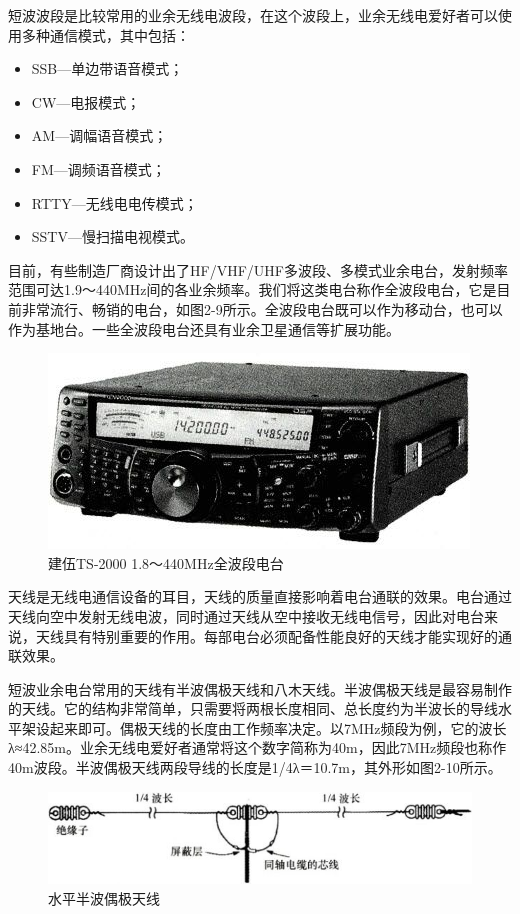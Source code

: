 \documentclass[12pt,UTF8]{ctexbook}
\begin{document}
短波波段是比较常用的业余无线电波段，在这个波段上，业余无线电爱好者可以使用多种通信模式，其中包括：

\begin{itemize}
	\item SSB—单边带语音模式；
	\item CW—电报模式；
	\item AM—调幅语音模式；
	\item FM—调频语音模式；
	\item RTTY—无线电电传模式；
	\item SSTV—慢扫描电视模式。
\end{itemize}

目前，有些制造厂商设计出了HF/VHF/UHF多波段、多模式业余电台，发射频率范围可达1.9～440MHz间的各业余频率。我们将这类电台称作全波段电台，它是目前非常流行、畅销的电台，如图2-9所示。全波段电台既可以作为移动台，也可以作为基地台。一些全波段电台还具有业余卫星通信等扩展功能。

\begin{figure}[htbp]
	\centering
	\includegraphics[width=0.7\linewidth]{26}
	\caption{建伍TS-2000 1.8～440MHz全波段电台}
	\label{fig:1}
\end{figure}

天线是无线电通信设备的耳目，天线的质量直接影响着电台通联的效果。电台通过天线向空中发射无线电波，同时通过天线从空中接收无线电信号，因此对电台来说，天线具有特别重要的作用。每部电台必须配备性能良好的天线才能实现好的通联效果。

短波业余电台常用的天线有半波偶极天线和八木天线。半波偶极天线是最容易制作的天线。它的结构非常简单，只需要将两根长度相同、总长度约为半波长的导线水平架设起来即可。偶极天线的长度由工作频率决定。以7MHz频段为例，它的波长λ≈42.85m。业余无线电爱好者通常将这个数字简称为40m，因此7MHz频段也称作40m波段。半波偶极天线两段导线的长度是1/4λ＝10.7m，其外形如图2-10所示。

\begin{figure}[htbp]
	\centering
	\includegraphics[width=0.7\linewidth]{27}
	\caption{水平半波偶极天线}
	\label{fig:1}
\end{figure}
\end{document}
